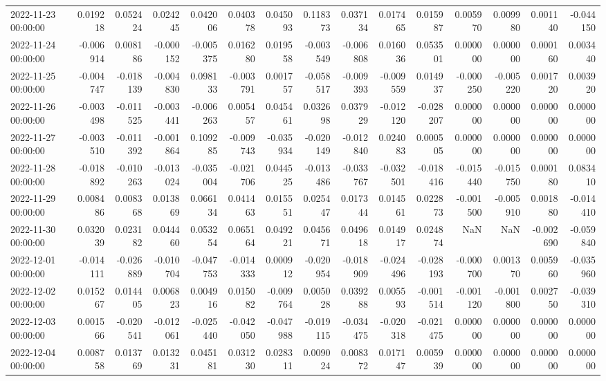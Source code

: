 \begin{tabular}{lrrrrrrrrrrrrrr}
2022-11-23 00:00:00 & 0.019218 & 0.052424 & 0.024245 & 0.042006 & 0.040378 & 0.045093 & 0.118373 & 0.037134 & 0.017465 & 0.015987 & 0.005970 & 0.009980 & 0.001140 & -0.044150 \\
2022-11-24 00:00:00 & -0.006914 & 0.008186 & -0.000152 & -0.005375 & 0.016280 & 0.019558 & -0.003549 & -0.006808 & 0.016036 & 0.053501 & 0.000000 & 0.000000 & 0.000160 & 0.003440 \\
2022-11-25 00:00:00 & -0.004747 & -0.018139 & -0.004830 & 0.098133 & -0.003791 & 0.001757 & -0.058517 & -0.009393 & -0.009559 & 0.014937 & -0.000250 & -0.005220 & 0.001720 & 0.003920 \\
2022-11-26 00:00:00 & -0.003498 & -0.011525 & -0.003441 & -0.006263 & 0.005457 & 0.045461 & 0.032698 & 0.037929 & -0.012120 & -0.028207 & 0.000000 & 0.000000 & 0.000000 & 0.000000 \\
2022-11-27 00:00:00 & -0.003510 & -0.011392 & -0.001864 & 0.109285 & -0.009743 & -0.035934 & -0.020149 & -0.012840 & 0.024083 & 0.000505 & 0.000000 & 0.000000 & 0.000000 & 0.000000 \\
2022-11-28 00:00:00 & -0.018892 & -0.010263 & -0.013024 & -0.035004 & -0.021706 & 0.044525 & -0.013486 & -0.033767 & -0.032501 & -0.018416 & -0.015440 & -0.015750 & 0.000180 & 0.083410 \\
2022-11-29 00:00:00 & 0.008486 & 0.008368 & 0.013869 & 0.066134 & 0.041463 & 0.015551 & 0.025447 & 0.017344 & 0.014561 & 0.022873 & -0.001500 & -0.005910 & 0.001880 & -0.014410 \\
2022-11-30 00:00:00 & 0.032039 & 0.023182 & 0.044460 & 0.053254 & 0.065164 & 0.049221 & 0.045671 & 0.049618 & 0.014917 & 0.024874 & NaN & NaN & -0.002690 & -0.059840 \\
2022-12-01 00:00:00 & -0.014111 & -0.026889 & -0.010704 & -0.047753 & -0.014333 & 0.000912 & -0.020954 & -0.018909 & -0.024496 & -0.028193 & -0.000700 & 0.001370 & 0.005960 & -0.035960 \\
2022-12-02 00:00:00 & 0.015267 & 0.014405 & 0.006823 & 0.004916 & 0.015082 & -0.009764 & 0.005028 & 0.039288 & 0.005593 & -0.001514 & -0.001120 & -0.001800 & 0.002750 & -0.039310 \\
2022-12-03 00:00:00 & 0.001566 & -0.020541 & -0.012061 & -0.025440 & -0.042050 & -0.047988 & -0.019115 & -0.034475 & -0.020318 & -0.021475 & 0.000000 & 0.000000 & 0.000000 & 0.000000 \\
2022-12-04 00:00:00 & 0.008758 & 0.013769 & 0.013231 & 0.045181 & 0.031230 & 0.028311 & 0.009024 & 0.008372 & 0.017147 & 0.005939 & 0.000000 & 0.000000 & 0.000000 & 0.000000 \\

\end{tabular}
